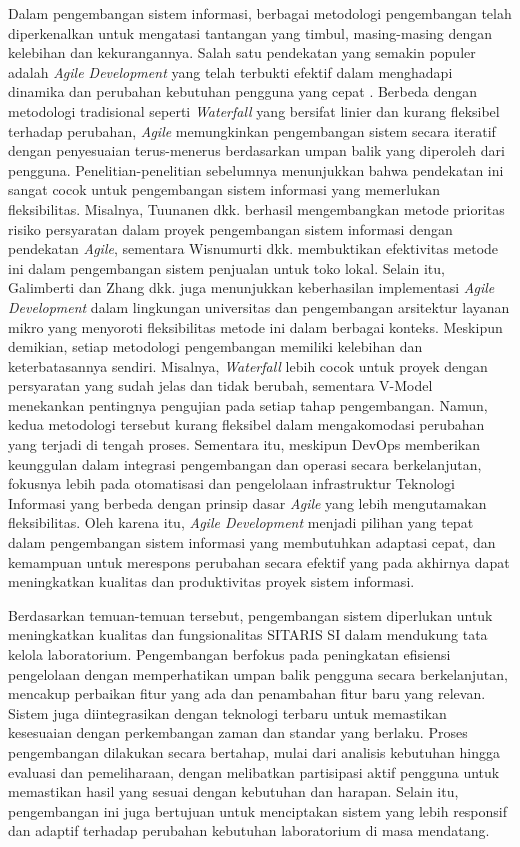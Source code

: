 Dalam pengembangan sistem informasi, berbagai metodologi pengembangan telah diperkenalkan untuk mengatasi tantangan yang timbul, masing-masing dengan kelebihan dan kekurangannya. Salah satu pendekatan yang semakin populer adalah \textit{Agile Development} yang telah terbukti efektif dalam menghadapi dinamika dan perubahan kebutuhan pengguna yang cepat \cite{al2020agile}. Berbeda dengan metodologi tradisional seperti \textit{Waterfall} yang bersifat linier dan kurang fleksibel terhadap perubahan, \textit{Agile} memungkinkan pengembangan sistem secara iteratif dengan penyesuaian terus-menerus berdasarkan umpan balik yang diperoleh dari pengguna. Penelitian-penelitian sebelumnya menunjukkan bahwa pendekatan ini sangat cocok untuk pengembangan sistem informasi yang memerlukan fleksibilitas. Misalnya, Tuunanen dkk. \citeyear{tuunanen2023development} berhasil mengembangkan metode prioritas risiko persyaratan dalam proyek pengembangan sistem informasi dengan pendekatan \textit{Agile}, sementara Wisnumurti dkk. \citeyear{wisnumurti2022penerapan} membuktikan efektivitas metode ini dalam pengembangan sistem penjualan untuk toko lokal. Selain itu, Galimberti \citeyear{trelles2021agile} dan Zhang dkk. \citeyear{zhang2024establishment} juga menunjukkan keberhasilan implementasi \textit{Agile Development} dalam lingkungan universitas dan pengembangan arsitektur layanan mikro yang menyoroti fleksibilitas metode ini dalam berbagai konteks. Meskipun demikian, setiap metodologi pengembangan memiliki kelebihan dan keterbatasannya sendiri. Misalnya, \textit{Waterfall} lebih cocok untuk proyek dengan persyaratan yang sudah jelas dan tidak berubah, sementara V-Model menekankan pentingnya pengujian pada setiap tahap pengembangan. Namun, kedua metodologi tersebut kurang fleksibel dalam mengakomodasi perubahan yang terjadi di tengah proses. Sementara itu, meskipun DevOps memberikan keunggulan dalam integrasi pengembangan dan operasi secara berkelanjutan, fokusnya lebih pada otomatisasi dan pengelolaan infrastruktur Teknologi Informasi yang berbeda dengan prinsip dasar \textit{Agile} yang lebih mengutamakan fleksibilitas. Oleh karena itu, \textit{Agile Development} menjadi pilihan yang tepat dalam pengembangan sistem informasi yang membutuhkan adaptasi cepat, dan kemampuan untuk merespons perubahan secara efektif yang pada akhirnya dapat meningkatkan kualitas dan produktivitas proyek sistem informasi.

Berdasarkan temuan-temuan tersebut, pengembangan sistem diperlukan untuk meningkatkan kualitas dan fungsionalitas SITARIS SI dalam mendukung tata kelola laboratorium. Pengembangan berfokus pada peningkatan efisiensi pengelolaan dengan memperhatikan umpan balik pengguna secara berkelanjutan, mencakup perbaikan fitur yang ada dan penambahan fitur baru yang relevan. Sistem juga diintegrasikan dengan teknologi terbaru untuk memastikan kesesuaian dengan perkembangan zaman dan standar yang berlaku. Proses pengembangan dilakukan secara bertahap, mulai dari analisis kebutuhan hingga evaluasi dan pemeliharaan, dengan melibatkan partisipasi aktif pengguna untuk memastikan hasil yang sesuai dengan kebutuhan dan harapan. Selain itu, pengembangan ini juga bertujuan untuk menciptakan sistem yang lebih responsif dan adaptif terhadap perubahan kebutuhan laboratorium di masa mendatang.

